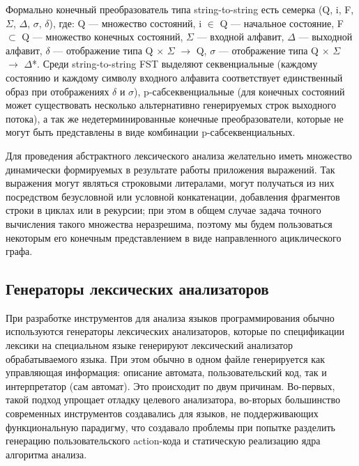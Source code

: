 Формально конечный преобразователь типа string-to-string есть семерка 
(Q, i, F, $\Sigma$, $\Delta$, $\sigma$, $\delta$), где: Q — множество состояний,
i $\in$ Q — начальное состояние, F $\subset$ Q — множество конечных состояний, 
$\Sigma$ — входной алфавит, $\Delta$ — выходной алфавит, $\delta$ — отображение 
типа Q $\times$ $\Sigma$ $\rightarrow$ Q, $\sigma$ — отображение типа Q $\times$ 
$\Sigma$ $\rightarrow$ $\Delta$*. 
Среди string-to-string FST выделяют секвенциальные (каждому состоянию и каждому 
символу входного алфавита соответствует единственный образ при отображениях 
$\delta$ и $\sigma$), p-сабсеквенциальные (для конечных состояний может существовать 
несколько альтернативно генерируемых строк выходного потока), а так же 
недетерминированные конечные преобразователи, которые не могут быть представлены 
в виде комбинации p-сабсеквенциальных. 

Для проведения абстрактного лексического анализа желательно иметь множество 
динамически формируемых в результате работы приложения выражений. Так выражения 
могут являться строковыми литералами, могут получаться из них посредством 
безусловной или условной конкатенации, добавления фрагментов строки в циклах или 
в рекурсии; при этом в общем случае задача точного вычисления такого множества 
неразрешима, поэтому мы будем пользоваться некоторым его конечным представлением 
в виде направленного ациклического графа.

\subsection{Генераторы лексических анализаторов}
При разработке инструментов для анализа языков программирования обычно 
используются генераторы лексических анализаторов, которые по спецификации лексики 
на специальном языке генерируют лексический анализатор обрабатываемого языка. 
При этом обычно в одном файле генерируется как управляющая информация: описание 
автомата, пользовательский код, так и интерпретатор (сам автомат).  Это 
происходит по двум причинам. Во-первых, такой подход упрощает отладку целевого 
анализатора, во-вторых большинство современных инструментов создавались для языков, 
не поддерживающих функциональную парадигму, что создавало проблемы при попытке 
разделить генерацию пользовательского action-кода и статическую реализацию ядра 
алгоритма анализа.

